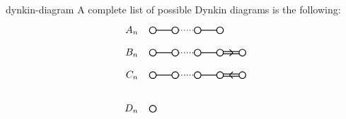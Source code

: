 \begin{example}{dynkin-diagram}
    A complete list of possible Dynkin diagrams is the following: 
    \[ \begin{tikzpicture}[scale=.4]
        \begin{scope}
            \draw (-1,0) node[anchor=east] {$A_n$};
            \draw[thick] (0cm,0) circle (.3cm);
            \draw[thick] (2cm,0) circle (.3cm);
            \draw[thick] (4cm,0) circle (.3cm);
            \draw[thick] (6cm,0) circle (.3cm);
            \draw[thick] (0.3cm,0) -- +(1.4 cm,0);
            \draw[thick, dotted] (2.3cm,0) -- +(1.4 cm,0);
            \draw[thick] (4.3cm,0) -- +(1.4 cm,0);
        \end{scope}
        \begin{scope}[yshift=-2.0cm]
            \draw (-1,0) node[anchor=east] {$B_n$};
            \draw[thick] (0cm,0) circle (.3cm);
            \draw[thick] (2cm,0) circle (.3cm);
            \draw[thick] (4cm,0) circle (.3cm);
            \draw[thick] (6cm,0) circle (.3cm);
            \draw[thick] (8cm,0) circle (.3cm);
            \draw[thick] (0.3cm,0) -- +(1.4 cm,0);
            \draw[thick, dotted] (2.3cm,0) -- +(1.4 cm,0);
            \draw[thick] (4.3cm,0) -- +(1.4 cm,0);
            \draw[thick] (6.3cm,0.1cm) -- +(1.4 cm,0cm);
            \draw[thick] (6.3cm,-0.1cm) -- +(1.4 cm,0cm);
            \draw[thick] (6.85cm,0.3cm) -- +(0.3cm,-0.3cm);
            \draw[thick] (6.85cm,-0.3cm) -- +(0.3cm,0.3cm);
        \end{scope}
        \begin{scope}[yshift=-4.0cm]
            \draw (-1,0) node[anchor=east] {$C_n$};
            \draw[thick] (0cm,0) circle (.3cm);
            \draw[thick] (2cm,0) circle (.3cm);
            \draw[thick] (4cm,0) circle (.3cm);
            \draw[thick] (6cm,0) circle (.3cm);
            \draw[thick] (8cm,0) circle (.3cm);
            \draw[thick] (0.3cm,0) -- +(1.4 cm,0);
            \draw[thick, dotted] (2.3cm,0) -- +(1.4 cm,0);
            \draw[thick] (4.3cm,0) -- +(1.4 cm,0);
            \draw[thick] (6.3cm,0.1cm) -- +(1.4 cm,0cm);
            \draw[thick] (6.3cm,-0.1cm) -- +(1.4 cm,0cm);
            \draw[thick] (7.15cm,0.3cm) -- +(-0.3cm,-0.3cm);
            \draw[thick] (7.15cm,-0.3cm) -- +(-0.3cm,0.3cm);
        \end{scope}
        \begin{scope}[yshift=-7.0cm]
            \draw (-1,0) node[anchor=east] {$D_n$};
            \draw[thick] (0cm,0) circle (.3cm);

\end{scope}
\end{tikzpicture}\]
\end{example}
